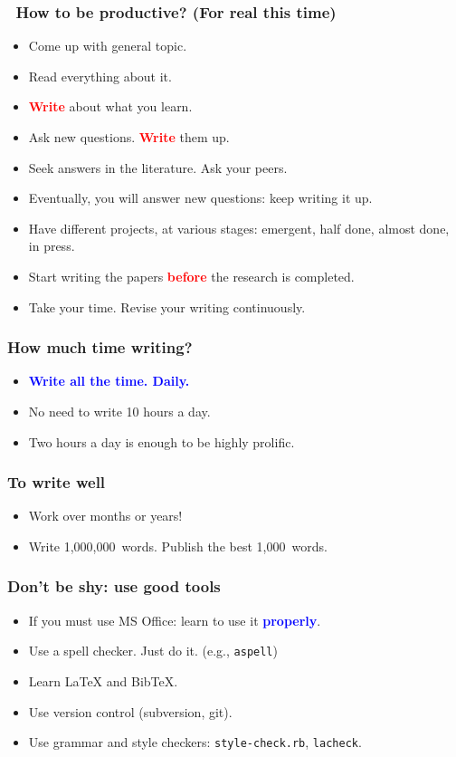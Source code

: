 \documentclass[handout]{beamer}
\newcommand{\vimportant}[1]{\textcolor{red}{\textbf{#1}}}
\newcommand{\important}[1]{\textcolor{blue}{\textbf{#1}}}
\begin{document}
\frame
{
  \frametitle{ How to be productive? (For real this time)}
 \begin{itemize}
 \item<1-> Come up with general topic.
  \item<2-> Read everything about it.
  \item<3-> \vimportant{Write} about what you learn.
  \item<4-> Ask new questions. \vimportant{Write} them up.
  \item<5-> Seek answers in the literature. Ask your peers.
  \item<6-> Eventually, you will answer new questions: keep writing it up.
  \item<7-> Have different projects, at various stages: emergent, half done, almost done, in press.
  \item<8-> Start writing the papers \vimportant{before} the research is completed.
  \item<9-> Take your time.  Revise your writing continuously.
 \end{itemize}
}

\frame
{
  \frametitle{How much time writing?}
 \begin{itemize}
  \item<1-> \important{Write all the time. Daily.}
  \item<2-> No need to write 10 hours a day.
  \item<3-> Two hours a day is enough to be highly prolific.
 \end{itemize}
}





\frame
{
  \frametitle{To write well}

 \begin{itemize}
  \item<1->  Work over months or years!
 \item<2->  Write 1,000,000~words. Publish the best 1,000~words.
 \end{itemize}
 }
\frame
{
  \frametitle{Don't be shy: use good tools}

 \begin{itemize}
  \item<1-> If you must use MS Office: learn to use it \important{properly}.
 \item<2-> Use a spell checker. Just do it. (e.g., \texttt{aspell})
 \item<3-> Learn \LaTeX{} and BibTeX.
  \item<4-> Use version control (subversion, git).
  \item<5-> Use grammar and style checkers: \texttt{style-check.rb}, \texttt{lacheck}.
   \end{itemize}
 }
\end{document}
